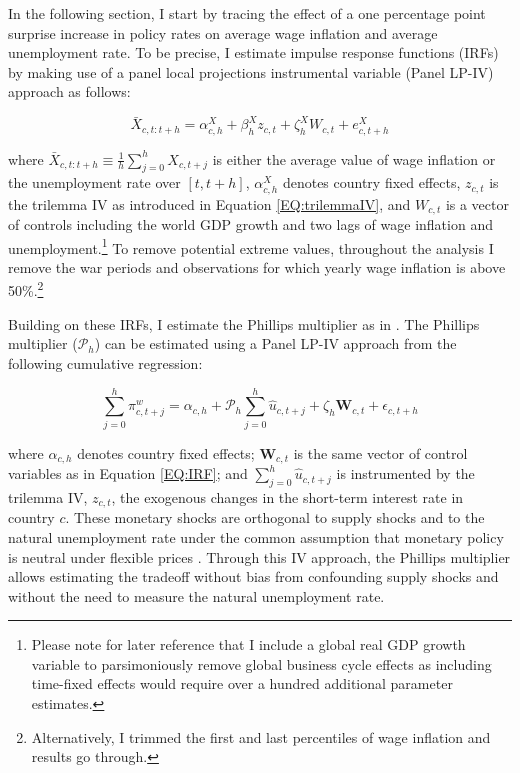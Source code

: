 \documentclass[12pt]{article}
\renewcommand{\vec}[1]{\mathbf{#1}}
\begin{document}
In the following section, I start by tracing the effect of a one percentage point surprise increase in policy rates on average wage inflation and average unemployment rate. To be precise, I estimate impulse response functions (IRFs) by making use of a panel local projections instrumental variable (Panel LP-IV) approach \citep{Jorda2005, Stock2018} as follows:

\begin{equation} \label{EQ:IRF}
	\bar{X}_{c,t:t+h} = \alpha^X_{c,h} + \beta_h^X z_{c,t} + \zeta^X_h W_{c,t} + e^X_{c,t+h}
\end{equation}

where $\bar{X}_{c,t:t+h} \equiv \frac{1}{h} \sum^h_{j=0} X_{c,t+j}$ is either the average value of wage inflation or the unemployment rate over $[t,t+h]$, $\alpha^X_{c,h}$ denotes country fixed effects, $z_{c,t}$ is the trilemma IV as introduced in Equation \eqref{EQ:trilemmaIV}, and $W_{c,t}$ is a vector of controls including the world GDP growth and two lags of wage inflation and unemployment.\footnote{Please note for later reference that I include a global real GDP growth variable to parsimoniously remove global business cycle effects as including time-fixed effects would require over a hundred additional parameter estimates.} To remove potential extreme values, throughout the analysis I remove the war periods and observations for which yearly wage inflation is above 50\%.\footnote{Alternatively, I trimmed the first and last percentiles of wage inflation and results go through.}

Building on these IRFs, I estimate the Phillips multiplier as in \cite{Barnichon2019}. The Phillips multiplier ($\mathcal{P}_h$) can be estimated using a Panel LP-IV approach from the following cumulative regression:

\begin{equation} \label{EQ:MULT}
	\sum_{j=0}^{h} \pi_{c,t+j}^{w} = \alpha_{c,h} + \mathcal{P}_h \sum_{j=0}^{h} \hat{u}_{c,t+j} + \zeta_h \vec{W}_{c,t} + \epsilon_{c,t+h}
\end{equation}

where $\alpha_{c,h}$ denotes country fixed effects; $\vec{W}_{c,t}$ is the same vector of control variables as in Equation \eqref{EQ:IRF}; and $\sum_{j=0}^{h} \hat{u}_{c,t+j}$ is instrumented by the trilemma IV, $z_{c,t}$, the exogenous changes in the short-term interest rate in country $c$. These monetary shocks are orthogonal to supply shocks and to the natural unemployment rate under the common assumption that monetary policy is neutral under flexible prices \citep{Gali2015}. Through this IV approach, the Phillips multiplier allows estimating the tradeoff without bias from confounding supply shocks and without the need to measure the natural unemployment rate.
\end{document}
